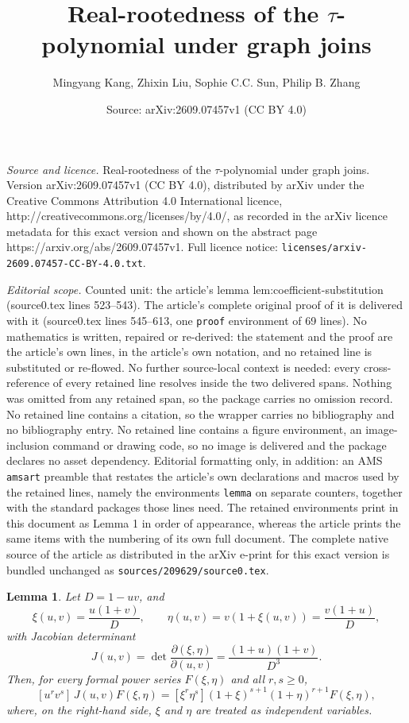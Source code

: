 \documentclass[10pt,a4paper]{amsart}
\title{Real-rootedness of the $\tau$-polynomial under graph joins}
\author{Mingyang Kang, Zhixin Liu, Sophie C.C. Sun, Philip B. Zhang}
\date{Source: arXiv:2609.07457v1 (CC BY 4.0)}
\newtheorem{lemma}{Lemma}
\begin{document}
\maketitle

\noindent\emph{Source and licence.} Real-rootedness of the $\tau$-polynomial under graph joins. Version arXiv:2609.07457v1 (CC BY 4.0), distributed by arXiv under the Creative Commons Attribution 4.0 International licence, http://creativecommons.org/licenses/by/4.0/, as recorded in the arXiv licence metadata for this exact version and shown on the abstract page https://arxiv.org/abs/2609.07457v1. Full licence notice: \texttt{licenses/arxiv-2609.07457-CC-BY-4.0.txt}.\par\smallskip

\noindent\textit{Editorial scope.} Counted unit: the article's lemma lem:coefficient-substitution (source0.tex lines 523--543). The article's complete original proof of it is delivered with it (source0.tex lines 545--613, one \texttt{proof} environment of 69 lines). No mathematics is written, repaired or re-derived: the statement and the proof are the article's own lines, in the article's own notation, and no retained line is substituted or re-flowed.  No further source-local context is needed: every cross-reference of every retained line resolves inside the two delivered spans.  Nothing was omitted from any retained span, so the package carries no omission record.  No retained line contains a citation, so the wrapper carries no bibliography and no bibliography entry.  No retained line contains a figure environment, an image-inclusion command or drawing code, so no image is delivered and the package declares no asset dependency.  Editorial formatting only, in addition: an AMS \texttt{amsart} preamble that restates the article's own declarations and macros used by the retained lines, namely the environments \texttt{lemma} on separate counters, together with the standard packages those lines need.  The retained environments print in this document as Lemma 1 in order of appearance, whereas the article prints the same items with the numbering of its own full document.  The complete native source of the article as distributed in the arXiv e-print for this exact version is bundled unchanged as \texttt{sources/209629/source0.tex}.
\begin{lemma}
\label{lem:coefficient-substitution}
Let $ D=1-uv$, and 
\begin{equation}\label{nj-9-mk9}
    \xi(u,v)=\frac{u(1+v)}{D},\qquad
 \eta(u,v)=v(1+\xi(u,v))=\frac{v(1+u)}{D},
\end{equation}
with Jacobian determinant
\begin{equation}\label{bn-sn-09}
 J(u,v)=\det\frac{\partial(\xi,\eta)}{\partial(u,v)}
       =\frac{(1+u)(1+v)}{D^3}.    
\end{equation}
Then, for every formal power series $F(\xi,\eta)$ and all $r,s\geq0$,
\begin{equation}\label{eq:coefficient-substitution}
 [u^rv^s]\,J(u,v)F(\xi,\eta)
 = [\xi^r\eta^s]
   (1+\xi)^{s+1}(1+\eta)^{r+1}F(\xi,\eta),
\end{equation}
where, on the right-hand side, $\xi$ and $\eta$ are treated as independent
  variables.
\end{lemma}
\end{document}
